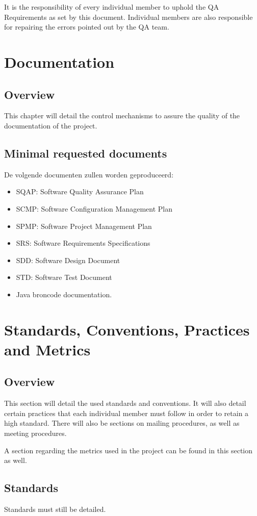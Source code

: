 \documentclass[salesmen, twoside]{softproj}
\begin{document}
\begin{projdoc}
It is the responsibility of every individual member to uphold the QA Requirements as set by this document. Individual members are also responsible for repairing the errors pointed out by the QA team.

\chapter{Documentation}
\section{Overview}
This chapter will detail the control mechanisms to assure the quality of the documentation of the project.
\section{Minimal requested documents}
De volgende documenten zullen worden geproduceerd:
\begin{itemize}
\item SQAP: Software Quality Assurance Plan
\item SCMP: Software Configuration Management Plan
\item SPMP: Software Project Management Plan
\item SRS: Software Requirements Specifications
\item SDD: Software Design Document
\item STD: Software Test Document
\item Java broncode documentation.
\end{itemize}

\chapter{Standards, Conventions, Practices and Metrics}
\section{Overview}
This section will detail the used standards and conventions. It will also detail certain practices that each individual member must follow in order to retain a high standard. There will also be sections on mailing procedures, as well as meeting procedures.

A section regarding the metrics used in the project can be found in this section as well.

\section{Standards}
Standards must still be detailed.

\end{projdoc}
\end{document}

